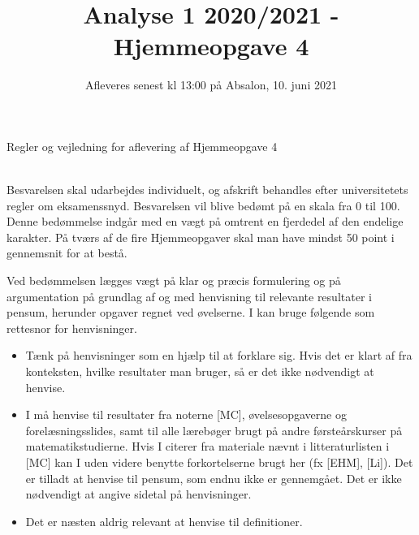 \documentclass{article}
\title{Analyse 1 2020/2021 - Hjemmeopgave 4}
\author{}
\date{\vspace{-1cm}Afleveres senest kl 13:00 på Absalon, 10. juni 2021}
\newif\ifrules
\begin{document}
	
	\maketitle
	
	\noindent
	
	
	
	\ifrules
	\newpage
	\noindent
	{\LARGE Regler og vejledning for aflevering af Hjemmeopgave 4}
	
	\noindent\hrulefill \\
	
	\noindent
	Besvarelsen skal udarbejdes individuelt, og afskrift behandles efter universitetets regler om eksamenssnyd. Besvarelsen vil blive bedømt på en skala fra 0 til 100. Denne bedømmelse indgår med en vægt på omtrent en fjerdedel af den endelige karakter. På tværs af de fire Hjemmeopgaver skal man have mindst 50 point i gennemsnit for at bestå.
	
	Ved bedømmelsen lægges vægt på klar og præcis formulering og på argumentation på grundlag af og med henvisning til relevante resultater i pensum, herunder opgaver regnet ved øvelserne. I kan bruge følgende som rettesnor for henvisninger.
	\begin{itemize}
		\item Tænk på henvisninger som en hjælp til at forklare sig. Hvis det er klart af fra konteksten, hvilke resultater man bruger, så er det ikke nødvendigt at henvise.
		
		\item I må henvise til resultater fra noterne [MC], øvelsesopgaverne og forelæsningsslides, samt til alle l\ae{}reb\o{}ger brugt p\aa{} andre f\o{}rste\aa{}rskurser p\aa{} matematikstudierne. Hvis I citerer fra materiale n\ae{}vnt i litteraturlisten i [MC] kan I uden videre benytte forkortelserne brugt her (fx [EHM], [Li]). Det er tilladt at henvise til pensum, som endnu ikke er gennemgået. Det er ikke nødvendigt at angive sidetal på henvisninger. 
		
		\item Det er næsten aldrig relevant at henvise til definitioner.
	\end{itemize}
	
	
\end{document}
